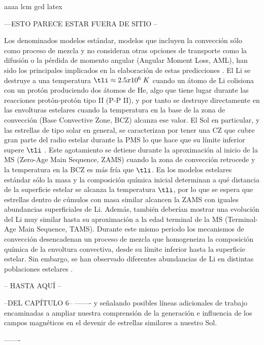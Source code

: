 aaaa \gls{lcm} \acrshort{gcd} \Gls{latex}

---ESTO PARECE ESTAR FUERA DE SITIO --

Los denominados modelos estándar, modelos que incluyen la convección sólo como proceso de mezcla y no consideran otras opciones de transporte como la difusión o la pérdida de momento angular (Angular Moment Loss, AML), han sido los principales implicados en la elaboración de estas predicciones \cite{Sestito2005}. El Li se destruye a una temperatura $\tli \approx 2.5 x 10^6\; K$ cuando un átomo de Li colisiona con un protón produciendo dos átomos de He, algo que tiene lugar durante las reacciones protón-protón tipo II (P-P II), y por tanto se destruye directamente en las envolturas estelares cuando la temperatura en la base de la zona de convección (Base Convective Zone, BCZ) alcanza ese valor. El Sol en particular, y las estrellas de tipo solar en general, se caracterizan por tener una CZ que cubre gran parte del radio estelar durante la PMS lo que hace que su límite inferior supere $\tli$ \cite{Iben1965}. Este agotamiento se detiene durante la aproximación al inicio de la MS (Zero-Age Main Sequence, ZAMS) cuando la zona de convección retrocede y la temperatura en la BCZ es más fría que $\tli$. En los modelos estelares estándar sólo la masa y la composición química inicial determinan a qué distancia de la superficie estelar se alcanza la temperatura $\tli$, por lo que se espera que estrellas dentro de cúmulos con masa similar alcancen la ZAMS con iguales abundancias superficiales de Li. Además, también deberían mostrar una evolución del Li muy similar hasta su aproximación a la edad terminal de la MS (Terminal-Age Main Sequence, TAMS). Durante este mismo periodo los mecanismos de convección desencadenan un proceso de mezcla que homogeneiza la composición química de la envoltura convectiva, desde su límite inferior hasta la superficie estelar. Sin embargo, se han observado diferentes abundancias de Li en distintas poblaciones estelares \cite[][y referencias en las mismas]{Somers2014}.\par

-- HASTA AQUÍ --

--DEL CAPÍTULO 6--
-------
y señalando posibles líneas adicionales de trabajo encaminadas a ampliar nuestra comprensión de la generación e influencia de los campos magnéticos en el devenir de estrellas similares a nuestro Sol.\par
-------
